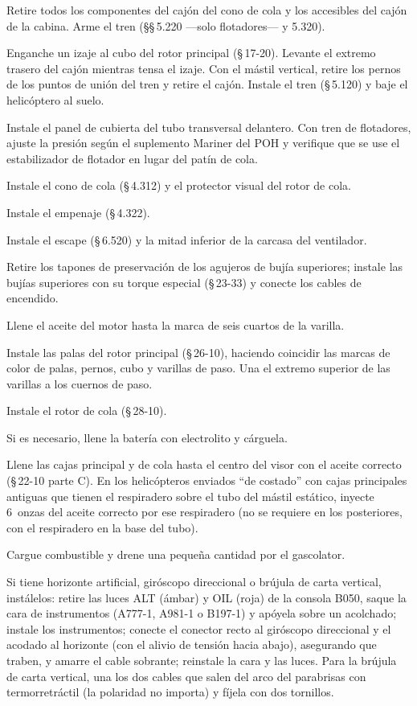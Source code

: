 \begin{pasos}
\item Retire todos los componentes del cajón del cono de cola y los accesibles del cajón de la cabina. Arme el tren (\S\S\,5.220 ---solo flotadores--- y 5.320).
\item Enganche un izaje al cubo del rotor principal (\S\,17-20). Levante el extremo trasero del cajón mientras tensa el izaje. Con el mástil vertical, retire los pernos de los puntos de unión del tren y retire el cajón. Instale el tren (\S\,5.120) y baje el helicóptero al suelo.
\item Instale el panel de cubierta del tubo transversal delantero. Con tren de flotadores, ajuste la presión según el suplemento Mariner del POH y verifique que se use el estabilizador de flotador en lugar del patín de cola.
\item Instale el cono de cola (\S\,4.312) y el protector visual del rotor de cola.
\item Instale el empenaje (\S\,4.322).
\item Instale el escape (\S\,6.520) y la mitad inferior de la carcasa del ventilador.
\item Retire los tapones de preservación de los agujeros de bujía superiores; instale las bujías superiores con su torque especial (\S\,23-33) y conecte los cables de encendido.
\item Llene el aceite del motor hasta la marca de seis cuartos de la varilla.
\item Instale las palas del rotor principal (\S\,26-10), haciendo coincidir las marcas de color de palas, pernos, cubo y varillas de paso. Una el extremo superior de las varillas a los cuernos de paso.
\item Instale el rotor de cola (\S\,28-10).
\item Si es necesario, llene la batería con electrolito y cárguela.
\item Llene las cajas principal y de cola hasta el centro del visor con el aceite correcto (\S\,22-10 parte C). En los helicópteros enviados ``de costado'' con cajas principales antiguas que tienen el respiradero sobre el tubo del mástil estático, inyecte 6~onzas del aceite correcto por ese respiradero (no se requiere en los posteriores, con el respiradero en la base del tubo).
\item Cargue combustible y drene una pequeña cantidad por el gascolator.
\item Si tiene horizonte artificial, giróscopo direccional o brújula de carta vertical, instálelos: retire las luces \textsf{ALT} (ámbar) y \textsf{OIL} (roja) de la consola B050, saque la cara de instrumentos (A777-1, A981-1 o B197-1) y apóyela sobre un acolchado; instale los instrumentos; conecte el conector recto al giróscopo direccional y el acodado al horizonte (con el alivio de tensión hacia abajo), asegurando que traben, y amarre el cable sobrante; reinstale la cara y las luces. Para la brújula de carta vertical, una los dos cables que salen del arco del parabrisas con termorretráctil (la polaridad no importa) y fíjela con dos tornillos.
\end{pasos}

